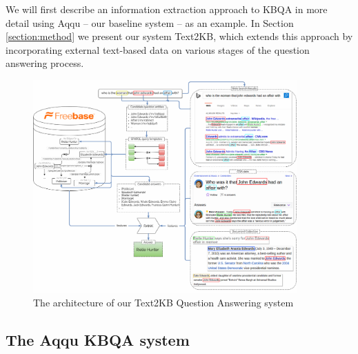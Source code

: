 
We will first describe an information extraction approach to KBQA in more detail using Aqqu -- our baseline system -- as an example.
In Section \ref{section:method} we present our system Text2KB, which extends this approach by incorporating external text-based data on various stages of the question answering process.

\begin{figure}[!ht]
\centering
\includegraphics[width=0.9\textwidth]{img/Text2KB_model}
\caption{The architecture of our Text2KB Question Answering system}
\label{fig:model}
\end{figure}


\subsection{The Aqqu KBQA system}
\label{sec:baseline:aqqu}

